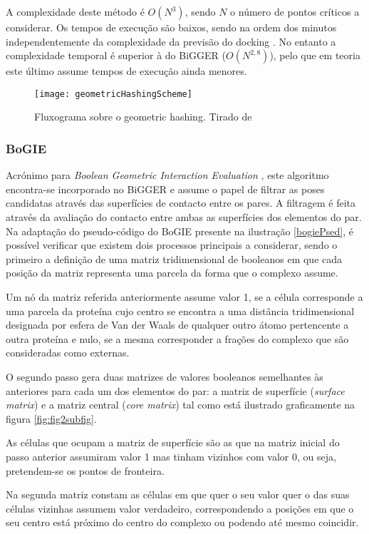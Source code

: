A complexidade deste método é $O(N^{3})$, sendo $N$ o número de pontos críticos a considerar. Os tempos de execução são baixos, sendo na ordem dos minutos independentemente da complexidade da previsão do docking \cite{halperin}. No entanto a complexidade temporal é superior à do BiGGER ($O(N^{2,8})$), pelo que em teoria este último assume tempos de execução ainda menores.

\begin{figure}[ht]
  \centering
    {\texttt{[image: geometricHashingScheme]}}
  \caption{Fluxograma sobre o geometric hashing. Tirado de \cite{geometry}}
  \label{geometricFig}
\end{figure}

\subsubsection{BoGIE}
\label{bogieAlg}
Acrónimo para \textit{Boolean Geometric Interaction Evaluation}\cite{teseProf} \cite{biggerPaper}, este algoritmo encontra-se incorporado no BiGGER e assume o papel de filtrar as poses candidatas através das superfícies de contacto entre os pares. A filtragem é feita através da avaliação do contacto entre ambas as superfícies dos elementos do par. Na adaptação do pseudo-código do BoGIE presente na ilustração \ref{bogiePsed}, é possível verificar que existem dois processos principais a considerar, sendo o primeiro a definição de uma matriz tridimensional de booleanos em que cada posição da matriz representa uma parcela da forma que o complexo assume.
 
 Um nó da matriz referida anteriormente assume valor 1, se a célula corresponde a uma parcela da proteína cujo centro se encontra a uma distância tridimensional designada por esfera de Van der Waals de qualquer outro átomo pertencente a outra proteína e nulo, se a mesma corresponder a frações do complexo que são consideradas como externas.

O segundo passo gera duas matrizes de valores booleanos semelhantes às anteriores para cada um dos elementos do par: a matriz de superfície (\textit{surface matrix}) e a matriz central (\textit{core matrix}) tal como está ilustrado graficamente na figura \ref{fig:fig2subfig}.

As células que ocupam a matriz de superfície são as que na matriz inicial do passo anterior assumiram valor 1 mas tinham vizinhos com valor 0, ou seja, pretendem-se os pontos de fronteira. 
 
 Na segunda matriz constam as células em que quer o seu valor quer o das suas células vizinhas assumem valor verdadeiro, correspondendo a posições em que o seu centro está próximo do centro do complexo ou podendo até mesmo coincidir. 
 
